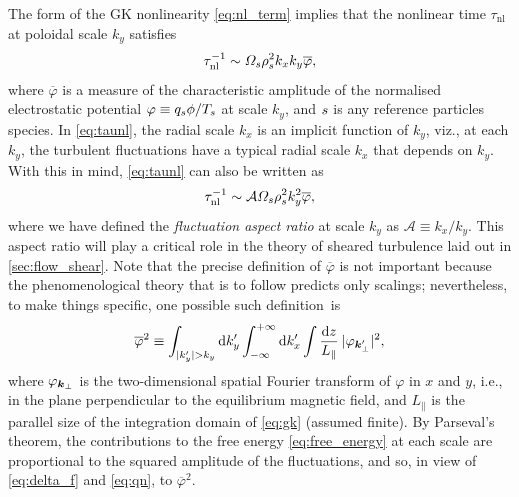 \documentclass{jpp}
\newcommand{\taunl}{\tau_\text{nl}}
\newcommand{\phinorm}{\varphi}
\newcommand{\phinormk}{\overline{\phinorm}}
\newcommand{\A}{\mathcal{A}}
\begin{document}
The form of the GK nonlinearity \cref{eq:nl_term} implies that the nonlinear time \(\taunl\) at poloidal scale \(k_y\) satisfies
\begin{equation}
	\taunl^{-1} \sim \Omega_\s \rho_\s^2 k_x k_y \phinormk,
	\label{eq:taunl}
\end{equation}
where \(\phinormk\) is a measure of the characteristic amplitude of the normalised electrostatic potential \mbox{\(\varphi \equiv q_s \phi / T_{s}\)} at scale \(k_y\), and \(s\) is any reference particles species. In \cref{eq:taunl}, the radial scale \(k_x\) is an implicit function of \(k_y\), viz., at each \(k_y\), the turbulent fluctuations have a typical radial scale \(k_x\) that depends on \(k_y\). With this in mind, \cref{eq:taunl} can also be written as
\begin{equation}
	\taunl^{-1} \sim \A \Omega_\s \rho_\s^2 k_y^2 \phinormk,
	\label{eq:taunl_A}
\end{equation}
where we have defined the \textit{fluctuation aspect ratio} at scale \(k_y\) as \(\A \equiv k_x/k_y\). This aspect ratio will play a critical role in the theory of sheared turbulence laid out in \cref{sec:flow_shear}. Note that the precise definition of \(\phinormk\) is not important because the phenomenological theory that is to follow predicts only scalings; nevertheless, to make things specific, one possible such definition~is
\begin{equation}
	\phinormk^2 \equiv \int_{|k_y'|>k_y} \rmd k_y' \int_{-\infty}^{+\infty} \rmd k_x'  \int \frac{\rmd z}{L_\parallel} \: |\phinorm_{\vec{k}_\perp'}|^2,
	\label{eq:phinormk_def}
\end{equation}
where \(\phinorm_\vkperp\) is the two-dimensional spatial Fourier transform of \(\varphi\) in \(x\) and \(y\), i.e., in the plane perpendicular to the equilibrium magnetic field, and \(L_\parallel\) is the parallel size of the integration domain of \cref{eq:gk} (assumed finite). By Parseval's theorem, the contributions to the free energy \cref{eq:free_energy} at each scale are proportional to the squared amplitude of the fluctuations, and so, in view of \cref{eq:delta_f} and \cref{eq:qn}, to \(\phinormk^2\).
\end{document}
